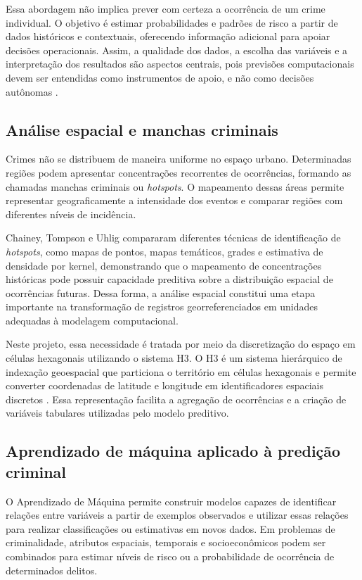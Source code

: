 \documentclass[12pt]{article}
\begin{document}
Essa abordagem não implica prever com certeza a ocorrência de um crime individual. O objetivo é estimar probabilidades e padrões de risco a partir de dados históricos e contextuais, oferecendo informação adicional para apoiar decisões operacionais. Assim, a qualidade dos dados, a escolha das variáveis e a interpretação dos resultados são aspectos centrais, pois previsões computacionais devem ser entendidas como instrumentos de apoio, e não como decisões autônomas \cite{perry2013}.

\subsection{Análise espacial e manchas criminais}
Crimes não se distribuem de maneira uniforme no espaço urbano. Determinadas regiões podem apresentar concentrações recorrentes de ocorrências, formando as chamadas manchas criminais ou \textit{hotspots}. O mapeamento dessas áreas permite representar geograficamente a intensidade dos eventos e comparar regiões com diferentes níveis de incidência.

Chainey, Tompson e Uhlig \cite{chainey2008} compararam diferentes técnicas de identificação de \textit{hotspots}, como mapas de pontos, mapas temáticos, grades e estimativa de densidade por kernel, demonstrando que o mapeamento de concentrações históricas pode possuir capacidade preditiva sobre a distribuição espacial de ocorrências futuras. Dessa forma, a análise espacial constitui uma etapa importante na transformação de registros georreferenciados em unidades adequadas à modelagem computacional.

Neste projeto, essa necessidade é tratada por meio da discretização do espaço em células hexagonais utilizando o sistema H3. O H3 é um sistema hierárquico de indexação geoespacial que particiona o território em células hexagonais e permite converter coordenadas de latitude e longitude em identificadores espaciais discretos \cite{uberh3}. Essa representação facilita a agregação de ocorrências e a criação de variáveis tabulares utilizadas pelo modelo preditivo.

\subsection{Aprendizado de máquina aplicado à predição criminal}
O Aprendizado de Máquina permite construir modelos capazes de identificar relações entre variáveis a partir de exemplos observados e utilizar essas relações para realizar classificações ou estimativas em novos dados. Em problemas de criminalidade, atributos espaciais, temporais e socioeconômicos podem ser combinados para estimar níveis de risco ou a probabilidade de ocorrência de determinados delitos.
\end{document}
